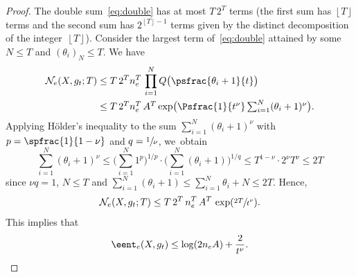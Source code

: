 \begin{proof}
The double sum~\eqref{eq:double} has at most $T \, 2^T$ terms (the first sum has $\left \lfloor{T}\right \rfloor$ terms and the second sum has $2^{\left \lfloor{T}\right \rfloor-1}$ terms given by the distinct decomposition of the integer~$\left \lfloor{T}\right \rfloor$).
Consider the largest term of~\eqref{eq:double} attained by some $N \leq T$ and $(\theta_i)_N \leq T$.
We have
\begin{equation}\label{eq:max}
\begin{aligned}
\mathcal{N}_e(X,g_t;T) & \leq T \, 2^T n_e^T \, \prod_{i=1}^N Q \bigl(\psfrac{\theta_i +1}{t} \bigr) \\
&\textstyle \leq T \, 2^T n_e^T \, A^T \exp \bigl(\Psfrac{1}{t^\nu} \sum_{i=1}^N (\theta_i +1)^\nu \bigr).
\end{aligned}
\end{equation}
Applying Hölder's inequality to the sum $\sum_{i=1}^N (\theta_i +1)^\nu$ with $p=\spfrac{1}{1-\nu}$ and $q=\sfrac{1}{\nu}$, we~obtain
\[
\sum_{i=1}^N (\theta_i +1)^\nu \leq \biggl(\sum_{i=1}^N 1^p \biggr)^{1/p} \cdot \biggl(\sum_{i=1}^N (\theta_i +1) \biggr)^{1/q} \leq T^{1-\nu} \cdot 2^\nu T^\nu \leq 2T
\]
since $\nu q =1$, $N \leq T$ and $\sum_{i=1}^N (\theta_i +1) \leq \sum_{i=1}^N \theta_i +N \leq 2T$.
Hence,
\[
\mathcal{N}_e(X,g_t;T) \leq T \, 2^T \, n_e^T \, A^T \, \exp(\sfrac{2T}{t^\nu}).
\]
This implies that
\[
\eent_e(X,g_t) \leq \log(2n_eA) + \frac{2}{t^\nu}.\qedhere
\]
\end{proof}

